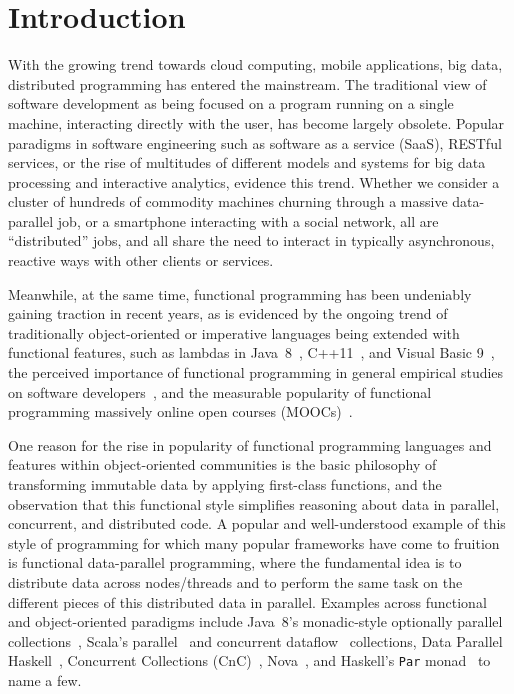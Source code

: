 \documentclass{llncs}
\begin{document}
\section{Introduction}

With the growing trend towards cloud computing, mobile applications, big data,
distributed programming has entered the mainstream. The
traditional view of software development as being focused on a program running
on a single machine, interacting directly with the user, has become largely
obsolete. Popular paradigms in software engineering such as software as a
service (SaaS), RESTful services, or the rise of multitudes of different
models and systems for big data processing and interactive analytics, evidence
this trend. Whether we consider a cluster of hundreds of commodity machines
churning through a massive data-parallel job, or a smartphone interacting with
a social network, all are ``distributed'' jobs, and all share the need to
interact in typically asynchronous, reactive ways with other clients or
services.

Meanwhile, at the same time, functional programming has been undeniably
gaining traction in recent years, as is evidenced by the ongoing trend of
traditionally object-oriented or imperative languages being extended with
functional features, such as lambdas in \mbox{Java 8}~\cite{JavaLambdas},
C++11~\cite{CplusplusLambas}, and Visual Basic 9~\cite{Meijer}, the perceived
importance of functional programming in general empirical studies on software
developers~\cite{PLAdoption}, and the measurable popularity of functional
programming massively online open courses (MOOCs)~\cite{ICSEMOOC}.

One reason for the rise in popularity of functional programming languages and
features within object-oriented communities is the basic philosophy of
transforming immutable data by applying first-class functions, and the
observation that this functional style simplifies reasoning about data in
parallel, concurrent, and distributed code. A popular and well-understood
example of this style of programming for which many popular frameworks have
come to fruition is functional data-parallel programming, where the
fundamental idea is to distribute data across nodes/threads and to perform the
same task on the different pieces of this distributed data in parallel.
Examples across functional and object-oriented paradigms include \mbox{Java
8}'s monadic-style optionally parallel collections~\cite{JavaLambdas}, Scala's
parallel~\cite{ScalaParColls} and concurrent dataflow~\cite{FlowPools}
collections, Data Parallel Haskell~\cite{DataParallelHaskell}, Concurrent
Collections (CnC)~\cite{CnC}, Nova~\cite{Nova}, and Haskell's \verb|Par|
monad~\cite{HaskellPar} to name a few.
\end{document}
